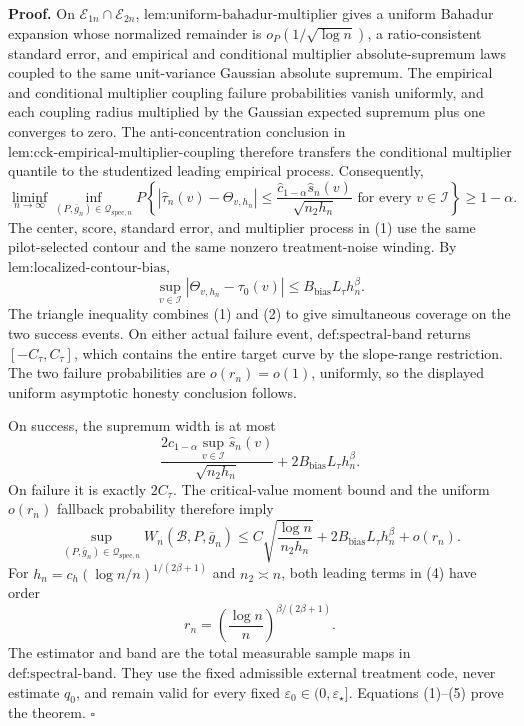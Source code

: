 \textbf{Proof.}
On \(\mathcal E_{1n}\cap\mathcal E_{2n}\), \(\text{lem:uniform-bahadur-multiplier}\) gives a uniform Bahadur expansion whose normalized remainder is \(o_P(1/\sqrt{\log n})\), a ratio-consistent standard error, and empirical and conditional multiplier absolute-supremum laws coupled to the same unit-variance Gaussian absolute supremum.  The empirical and conditional multiplier coupling failure probabilities vanish uniformly, and each coupling radius multiplied by the Gaussian expected supremum plus one converges to zero.  The anti-concentration conclusion in \(\text{lem:cck-empirical-multiplier-coupling}\) therefore transfers the conditional multiplier quantile to the studentized leading empirical process.  Consequently,
\[
 \liminf_{n\to\infty}\inf_{(P,\bar g_n)\in\mathcal Q_{\mathrm{spec},n}}
 P\left\{
 |\widehat\tau_n(v)-\Theta_{v,h_n}|
 \le\frac{\widehat c_{1-\alpha}\widehat s_n(v)}{\sqrt{n_2h_n}}
 \text{ for every }v\in\mathcal I
 \right\}\ge1-\alpha. \tag{1}
\]
The center, score, standard error, and multiplier process in (1) use the same pilot-selected contour and the same nonzero treatment-noise winding.  By \(\text{lem:localized-contour-bias}\),
\[
 \sup_{v\in\mathcal I}|\Theta_{v,h_n}-\tau_0(v)|
 \le B_{\mathrm{bias}}L_\tau h_n^\beta. \tag{2}
\]
The triangle inequality combines (1) and (2) to give simultaneous coverage on the two success events.  On either actual failure event, \(\text{def:spectral-band}\) returns \([-C_\tau,C_\tau]\), which contains the entire target curve by the slope-range restriction.  The two failure probabilities are \(o(r_n)=o(1)\), uniformly, so the displayed uniform asymptotic honesty conclusion follows.

On success, the supremum width is at most
\[
 \frac{2\widehat c_{1-\alpha}\sup_{v\in\mathcal I}\widehat s_n(v)}{\sqrt{n_2h_n}}
 +2B_{\mathrm{bias}}L_\tau h_n^\beta. \tag{3}
\]
On failure it is exactly \(2C_\tau\).  The critical-value moment bound and the uniform \(o(r_n)\) fallback probability therefore imply
\[
 \sup_{(P,\bar g_n)\in\mathcal Q_{\mathrm{spec},n}}
 W_n(\mathcal B,P,\bar g_n)
 \le C\sqrt{\frac{\log n}{n_2h_n}}
 +2B_{\mathrm{bias}}L_\tau h_n^\beta+o(r_n). \tag{4}
\]
For \(h_n=c_h(\log n/n)^{1/(2\beta+1)}\) and \(n_2\asymp n\), both leading terms in (4) have order
\[
 r_n=\left(\frac{\log n}{n}\right)^{\beta/(2\beta+1)}. \tag{5}
\]
The estimator and band are the total measurable sample maps in \(\text{def:spectral-band}\).  They use the fixed admissible external treatment code, never estimate \(q_0\), and remain valid for every fixed \(\varepsilon_0\in(0,\varepsilon_\star]\).  Equations (1)--(5) prove the theorem. \(\square\)
